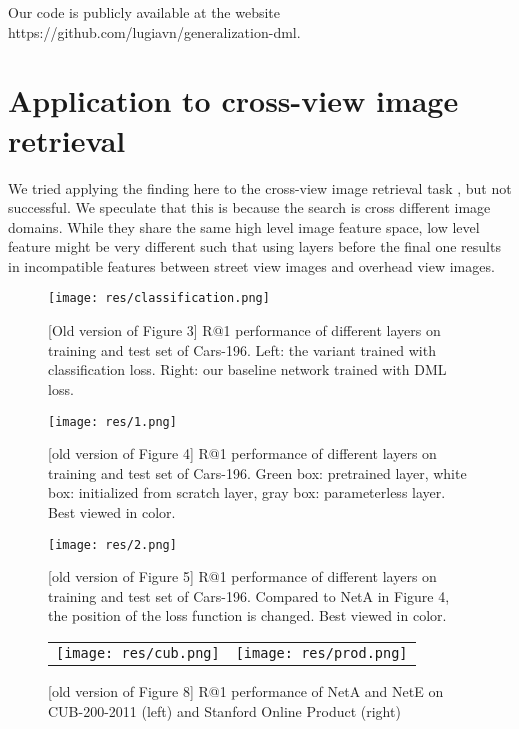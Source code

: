 \documentclass[10pt,twocolumn,letterpaper]{article}
\begin{document}
Our code is publicly available at the website https://github.com/lugiavn/generalization-dml.

\section{Application to cross-view image retrieval}

We tried applying the finding here to the cross-view image retrieval task \cite{vo2016localizing}, but not successful. We speculate that this is because the search is cross different image domains. While they share the same high level image feature space, low level feature might be very different such that using layers before the final one results in incompatible features between street view images and overhead view images.

\newpage

\begin{figure}
  \texttt{[image: res/classification.png]}
  \caption{[Old version of Figure 3] R@1 performance of different layers on training and test set of Cars-196. Left: the variant trained with classification loss. Right: our baseline network trained with DML loss.}
  \label{fig:classification_old}
\end{figure}

\begin{figure*}[h!]
\begin{center}
  \texttt{[image: res/1.png]}
  \vspace{5pt}
  \caption{[old version of Figure 4] R@1 performance of different layers on training and test set of Cars-196. Green box: pretrained layer, white box: initialized from scratch layer, gray box: parameterless layer. Best viewed in color.}
  \label{fig:analysize1_old}
\end{center}

\begin{center}
  \texttt{[image: res/2.png]}
  \vspace{5pt}
  \caption{[old version of Figure 5] R@1 performance of different layers on training and test set of Cars-196. Compared to NetA in Figure 4, the position of the loss function is changed. Best viewed in color.}
  \label{fig:analysize2_old}
\end{center}
\end{figure*}


\begin{figure*}[h]
\begin{tabular}{ll}
\texttt{[image: res/cub.png]}
&
\texttt{[image: res/prod.png]}
\end{tabular}
\caption{[old version of Figure 8] R@1 performance of NetA and NetE on CUB-200-2011 (left) and Stanford Online Product (right)}
\label{fig:cub_old}
\end{figure*}
\end{document}
